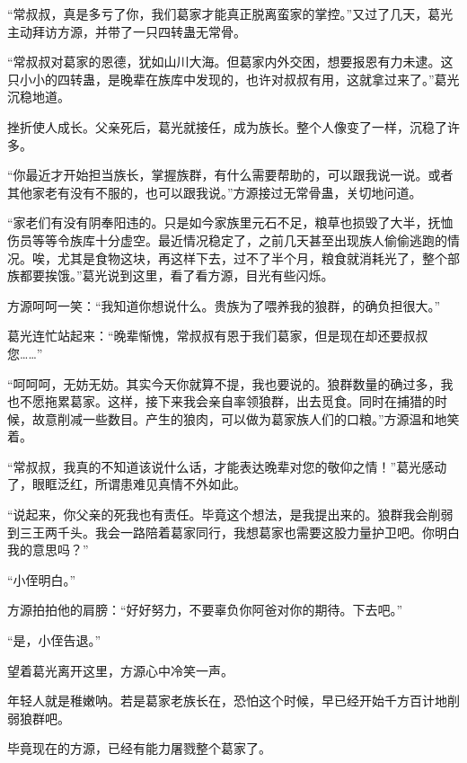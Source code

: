 \begin{this_body}
“常叔叔，真是多亏了你，我们葛家才能真正脱离蛮家的掌控。”又过了几天，葛光主动拜访方源，并带了一只四转蛊无常骨。

“常叔叔对葛家的恩德，犹如山川大海。但葛家内外交困，想要报恩有力未逮。这只小小的四转蛊，是晚辈在族库中发现的，也许对叔叔有用，这就拿过来了。”葛光沉稳地道。

挫折使人成长。父亲死后，葛光就接任，成为族长。整个人像变了一样，沉稳了许多。

“你最近才开始担当族长，掌握族群，有什么需要帮助的，可以跟我说一说。或者其他家老有没有不服的，也可以跟我说。”方源接过无常骨蛊，关切地问道。

“家老们有没有阴奉阳违的。只是如今家族里元石不足，粮草也损毁了大半，抚恤伤员等等令族库十分虚空。最近情况稳定了，之前几天甚至出现族人偷偷逃跑的情况。唉，尤其是食物这块，再这样下去，过不了半个月，粮食就消耗光了，整个部族都要挨饿。”葛光说到这里，看了看方源，目光有些闪烁。

方源呵呵一笑：“我知道你想说什么。贵族为了喂养我的狼群，的确负担很大。”

葛光连忙站起来：“晚辈惭愧，常叔叔有恩于我们葛家，但是现在却还要叔叔您……”

“呵呵呵，无妨无妨。其实今天你就算不提，我也要说的。狼群数量的确过多，我也不愿拖累葛家。这样，接下来我会亲自率领狼群，出去觅食。同时在捕猎的时候，故意削减一些数目。产生的狼肉，可以做为葛家族人们的口粮。”方源温和地笑着。

“常叔叔，我真的不知道该说什么话，才能表达晚辈对您的敬仰之情！”葛光感动了，眼眶泛红，所谓患难见真情不外如此。

“说起来，你父亲的死我也有责任。毕竟这个想法，是我提出来的。狼群我会削弱到三王两千头。我会一路陪着葛家同行，我想葛家也需要这股力量护卫吧。你明白我的意思吗？”

“小侄明白。”

方源拍拍他的肩膀：“好好努力，不要辜负你阿爸对你的期待。下去吧。”

“是，小侄告退。”

望着葛光离开这里，方源心中冷笑一声。

年轻人就是稚嫩呐。若是葛家老族长在，恐怕这个时候，早已经开始千方百计地削弱狼群吧。

毕竟现在的方源，已经有能力屠戮整个葛家了。

\end{this_body}

